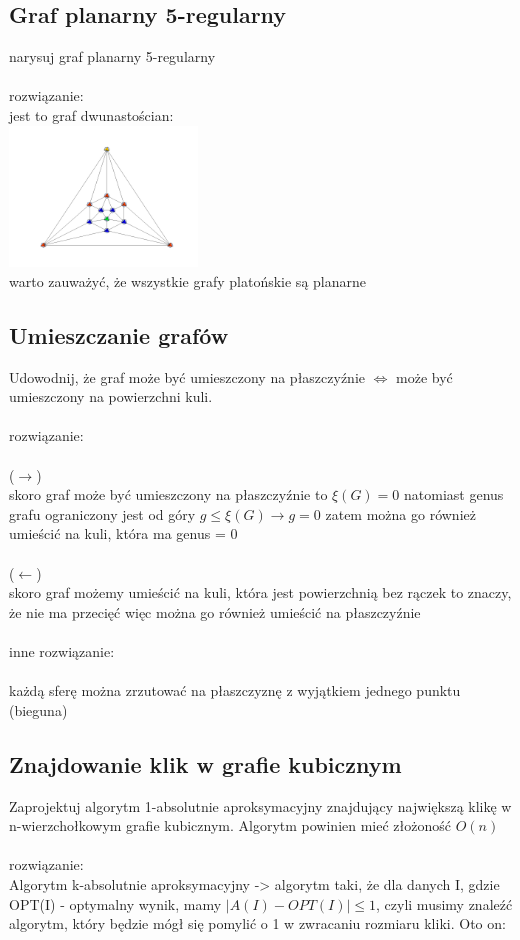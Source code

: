 \documentclass{article}
\begin{document}
\subsection*{Graf planarny 5-regularny}
narysuj graf planarny 5-regularny \\\\ rozwiązanie: \\
jest to graf dwunastościan: \\
\includegraphics[width=5cm]{icosahedron} \\
warto zauważyć, że wszystkie grafy platońskie są planarne

\subsection*{Umieszczanie grafów}
Udowodnij, że graf może być umieszczony na płaszczyźnie $\iff$ może być umieszczony na powierzchni kuli. \\\\rozwiązanie:\\\\
($\longrightarrow$)\\
skoro graf może być umieszczony na płaszczyźnie to $\xi(G) = 0$ natomiast genus grafu ograniczony jest od góry $g \leq \xi(G) \rightarrow g = 0$ zatem można go również umieścić na kuli, która ma genus = 0\\\\
($\longleftarrow$) \\
skoro graf możemy umieścić na kuli, która jest powierzchnią bez rączek to znaczy, że nie ma przecięć więc można go również umieścić na płaszczyźnie \\\\
inne rozwiązanie:\\\\
każdą sferę można zrzutować na płaszczyznę z wyjątkiem jednego punktu (bieguna)



\subsection*{Znajdowanie klik w grafie kubicznym}
Zaprojektuj algorytm 1-absolutnie aproksymacyjny znajdujący największą klikę w n-wierzchołkowym grafie kubicznym. Algorytm powinien mieć złożoność $O(n)$ \\\\rozwiązanie:\\
Algorytm k-absolutnie aproksymacyjny -> algorytm taki, że dla danych I, gdzie OPT(I) - optymalny wynik, mamy $|A(I) - OPT(I)| \leq 1$, czyli musimy znaleźć algorytm, 
który będzie mógł się pomylić o 1 w zwracaniu rozmiaru kliki. Oto on:
\end{document}
